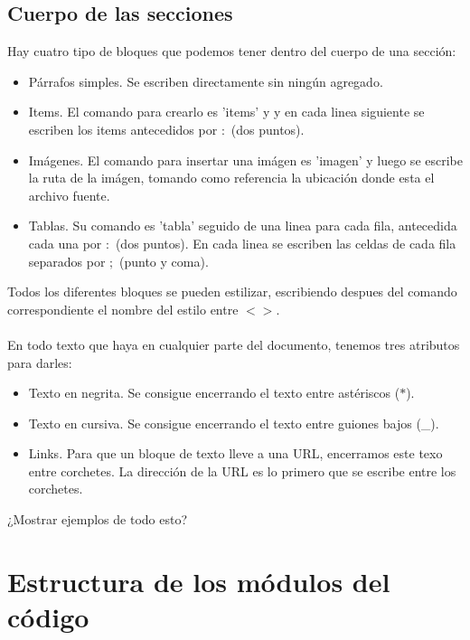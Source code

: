 \documentclass{article}
\begin{document}
\subsection{Cuerpo de las secciones}

Hay cuatro tipo de bloques que podemos tener dentro del cuerpo de una sección:
\begin{itemize}
    \item Párrafos simples. Se escriben directamente sin ningún agregado.
    \item Items. El comando para crearlo es 'items' y y en cada linea siguiente se escriben los items antecedidos por $:$ (dos puntos).
    \item Imágenes. El comando para insertar una imágen es 'imagen' y luego se escribe la ruta de la imágen, tomando como referencia la ubicación donde esta el archivo fuente.
    \item Tablas. Su comando es 'tabla' seguido de una linea para cada fila, antecedida cada una por $:$ (dos puntos). En cada linea se escriben las celdas de cada fila separados por $;$ (punto y coma).
\end{itemize}
Todos los diferentes bloques se pueden estilizar, escribiendo despues del comando correspondiente el nombre del estilo entre $< >$.
\\~\\
En todo texto que haya en cualquier parte del documento, tenemos tres atributos para darles:
\begin{itemize}
    \item Texto en negrita. Se consigue encerrando el texto entre astériscos ($*$).
    \item Texto en cursiva. Se consigue encerrando el texto entre guiones bajos (\_).
    \item Links. Para que un bloque de texto lleve a una URL, encerramos este texo entre corchetes. La dirección de la URL es lo primero que se escribe entre los corchetes.
\end{itemize}
¿Mostrar ejemplos de todo esto?

\section{Estructura de los módulos del código}
\end{document}
